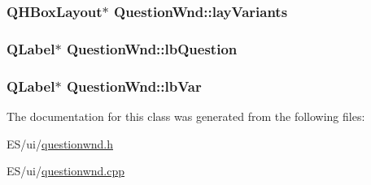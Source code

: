 \label{class_question_wnd_a6f71d0746090cbab4b0940ea78580a6a}
\hypertarget{class_question_wnd_a711a0484b118a7c5010e1d88eda8bc2e}{
\subsubsection[{layVariants}]{\setlength{\rightskip}{0pt plus 5cm}QHBoxLayout$\ast$ {\bf QuestionWnd::layVariants}}}
\label{class_question_wnd_a711a0484b118a7c5010e1d88eda8bc2e}
\hypertarget{class_question_wnd_a9d21de1eeed095229785ee0a0d5860fc}{
\subsubsection[{lbQuestion}]{\setlength{\rightskip}{0pt plus 5cm}QLabel$\ast$ {\bf QuestionWnd::lbQuestion}}}
\label{class_question_wnd_a9d21de1eeed095229785ee0a0d5860fc}
\hypertarget{class_question_wnd_ae7c58d40e74ea2ea9135456ef55e158b}{
\subsubsection[{lbVar}]{\setlength{\rightskip}{0pt plus 5cm}QLabel$\ast$ {\bf QuestionWnd::lbVar}}}
\label{class_question_wnd_ae7c58d40e74ea2ea9135456ef55e158b}


The documentation for this class was generated from the following files:\begin{DoxyCompactItemize}
\item 
ES/ui/\hyperlink{questionwnd_8h}{questionwnd.h}\item 
ES/ui/\hyperlink{questionwnd_8cpp}{questionwnd.cpp}\end{DoxyCompactItemize}
